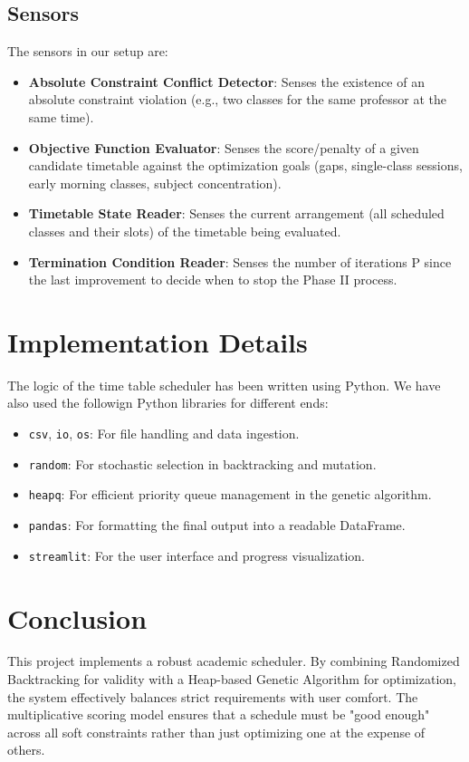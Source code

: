 \documentclass[a4paper,twoside,11pt]{article}
\begin{document}
        \subsection{Sensors}
            The sensors in our setup are:
            \begin{itemize}
                \itemsep0em
                \item \textbf{Absolute Constraint Conflict Detector}: Senses the existence of an absolute constraint violation (e.g., two classes for the same professor at the same time).
                \item \textbf{Objective Function Evaluator}: Senses the score/penalty of a given candidate timetable against the optimization goals (gaps, single-class sessions, early morning classes, subject concentration).
                \item \textbf{Timetable State Reader}: Senses the current arrangement (all scheduled classes and their slots) of the timetable being evaluated.
                \item \textbf{Termination Condition Reader}: Senses the number of iterations P since the last improvement to decide when to stop the Phase II process.
            \end{itemize}

    \section{Implementation Details}
        The logic of the time table scheduler has been written using Python. We have also used the followign Python libraries for different ends:
        \begin{itemize}
            \itemsep0em
            \item \texttt{csv}, \texttt{io}, \texttt{os}: For file handling and data ingestion.
            \item \texttt{random}: For stochastic selection in backtracking and mutation.
            \item \texttt{heapq}: For efficient priority queue management in the genetic algorithm.
            \item \texttt{pandas}: For formatting the final output into a readable DataFrame.
            \item \texttt{streamlit}: For the user interface and progress visualization.
        \end{itemize}

    \section{Conclusion}

        This project implements a robust academic scheduler. By combining Randomized Backtracking for validity with a Heap-based Genetic Algorithm for optimization, the system effectively balances strict requirements with user comfort. The multiplicative scoring model ensures that a schedule must be "good enough" across all soft constraints rather than just optimizing one at the expense of others.
            




                
\end{document}
